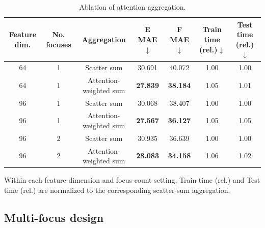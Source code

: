 \begin{table}[ht]
    \centering
    \scriptsize
    \begin{threeparttable}
        \caption{Ablation of attention aggregation.}
        \label{tab:dpa4_attention_ablation}
        \begin{tabular}{@{}ccccccc@{}}
            \toprule
            \textbf{Feature dim.}                  &
            \textbf{No. focuses}                   &
            \textbf{Aggregation}                   &
            \textbf{E MAE}$\downarrow$             &
            \textbf{F MAE}$\downarrow$             &
            \textbf{Train time (rel.)}$\downarrow$ &
            \textbf{Test time (rel.)}$\downarrow$                                                                                 \\
            \midrule
            64                                     & 1 & Scatter sum            & 30.691          & 40.072          & 1.00 & 1.00 \\
            64                                     & 1 & Attention-weighted sum & \textbf{27.839} & \textbf{38.184} & 1.05 & 1.01 \\
            \midrule
            96                                     & 1 & Scatter sum            & 30.068          & 38.407          & 1.00 & 1.00 \\
            96                                     & 1 & Attention-weighted sum & \textbf{27.567} & \textbf{36.127} & 1.05 & 1.05 \\
            \midrule
            96                                     & 2 & Scatter sum            & 30.935          & 36.639          & 1.00 & 1.00 \\
            96                                     & 2 & Attention-weighted sum & \textbf{28.083} & \textbf{34.158} & 1.06 & 1.02 \\
            \bottomrule
        \end{tabular}
        \begin{tablenotes}
            \item[a] Within each feature-dimension and focus-count setting, Train time (rel.) and
            Test time (rel.) are normalized to the corresponding scatter-sum aggregation.
        \end{tablenotes}
    \end{threeparttable}
\end{table}

\FloatBarrier
\subsection{Multi-focus design}
\label{sec:sm-multifocus}


